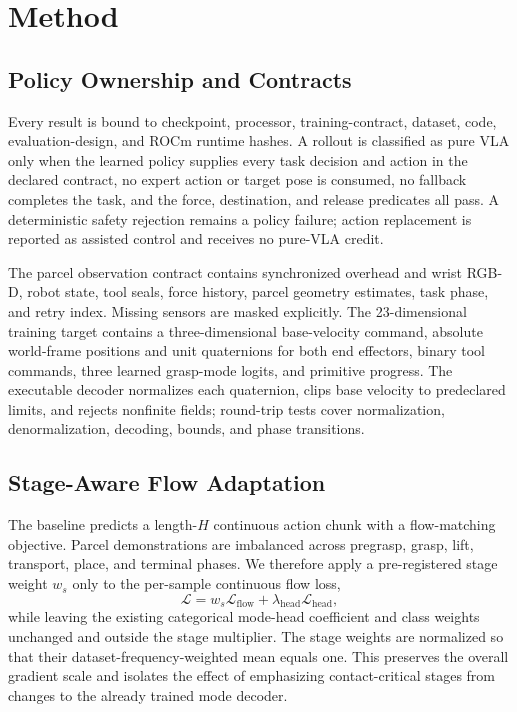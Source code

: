\documentclass[11pt]{article}
\begin{document}
\section{Method}

\subsection{Policy Ownership and Contracts}

Every result is bound to checkpoint, processor, training-contract, dataset,
code, evaluation-design, and ROCm runtime hashes. A rollout is classified as
pure VLA only when the learned policy supplies every task decision and action in
the declared contract, no expert action or target pose is consumed, no fallback
completes the task, and the force, destination, and release predicates all pass.
A deterministic safety rejection remains a policy failure; action replacement
is reported as assisted control and receives no pure-VLA credit.

The parcel observation contract contains synchronized overhead and wrist RGB-D,
robot state, tool seals, force history, parcel geometry estimates, task phase,
and retry index. Missing sensors are masked explicitly. The 23-dimensional
training target contains a three-dimensional base-velocity command, absolute
world-frame positions and unit quaternions for both end effectors, binary tool
commands, three learned grasp-mode logits, and primitive progress. The executable
decoder normalizes each quaternion, clips base velocity to predeclared limits,
and rejects nonfinite fields; round-trip tests cover normalization,
denormalization, decoding, bounds, and phase transitions.

\subsection{Stage-Aware Flow Adaptation}

The baseline predicts a length-$H$ continuous action chunk with a flow-matching
objective. Parcel demonstrations are imbalanced across pregrasp, grasp, lift,
transport, place, and terminal phases. We therefore apply a pre-registered stage
weight $w_s$ only to the per-sample continuous flow loss,
\begin{equation}
  \mathcal{L}=w_s\mathcal{L}_{\mathrm{flow}}+
  \lambda_{\mathrm{head}}\mathcal{L}_{\mathrm{head}},
\end{equation}
while leaving the existing categorical mode-head coefficient and class weights
unchanged and outside the stage multiplier. The stage weights are normalized so
that their dataset-frequency-weighted mean equals one. This preserves the overall
gradient scale and isolates the effect of emphasizing contact-critical stages
from changes to the already trained mode decoder.
\end{document}
